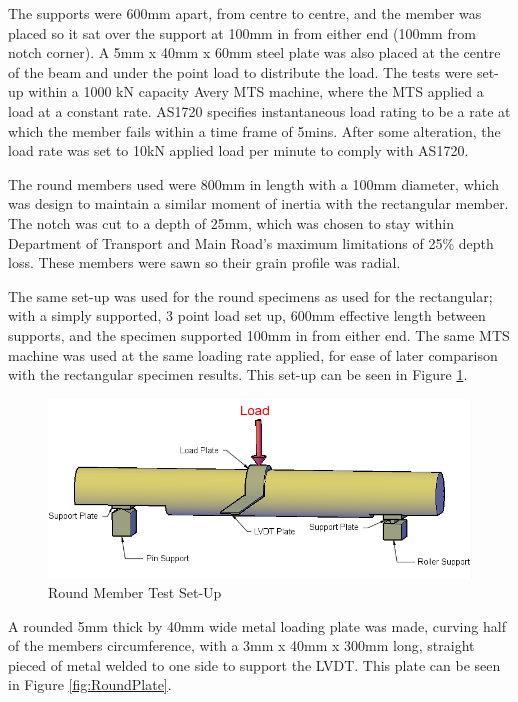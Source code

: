 \documentclass[11pt,a4paper]{article}
\numberwithin{equation}{subsection}
\begin{document}
\noindent
The supports were 600mm apart, from centre to centre, and the member was placed so it sat over the support at 100mm in from either end (100mm from notch corner). A 5mm x 40mm x 60mm steel plate was also placed at the centre of the beam and under the point load to distribute the load. The tests were set-up within a 1000 kN capacity Avery MTS machine, where the MTS applied a load at a constant rate. AS1720 specifies instantaneous load rating to be a rate at which the member fails within a time frame of 5mins. After some alteration, the load rate was set to 10kN applied load per minute to comply with AS1720. 


\noindent
The round members used were 800mm in length with a 100mm diameter, which was design to maintain a similar moment of inertia with the rectangular member. The notch was cut to a depth of 25mm, which was chosen to stay within Department of Transport and Main Road's maximum limitations of 25\% depth loss. These members were sawn so their grain profile was radial. 

\vspace*{\baselineskip}

\noindent
The same set-up was used for the round specimens as used for the rectangular; with a simply supported, 3 point load set up, 600mm effective length between supports, and the specimen supported 100mm in from either end. The same MTS machine was used at the same loading rate applied, for ease of later comparison with the rectangular specimen results. This set-up can be seen in Figure \ref{fig:round}.


\begin{figure}[h]
	\begin{center}
		\includegraphics[scale=0.55]{Circular_Setup}
	\end{center}
	\caption{Round Member Test Set-Up}
	\label{fig:round}
\end{figure}
\pagebreak

\noindent
A rounded 5mm thick by 40mm wide metal loading plate was made, curving half of the members circumference, with a 3mm x 40mm x 300mm long, straight pieced of metal welded to one side to support the LVDT. This plate can be seen in Figure \ref{fig:RoundPlate}. 
\end{document}
